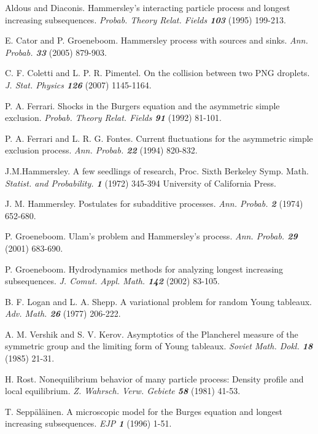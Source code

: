 \documentclass[reqno, 12pt]{amsart}
\begin{document}
\begin{thebibliography}{60}

 Aldous and Diaconis. Hammersley's interacting particle process and longest
increasing subsequences. {\sl Probab. Theory Relat. Fields \bf 103}
(1995) 199-213.

 E. Cator and P. Groeneboom. Hammersley process with sources and sinks. {\sl Ann. Probab. \bf 33} (2005) 879-903.

 C. F. Coletti and L. P. R. Pimentel. On the collision between two PNG droplets.
{\sl J. Stat. Physics \bf 126} (2007) 1145-1164.

 P. A. Ferrari. Shocks in the Burgers equation and the asymmetric simple exclusion.
{\sl Probab. Theory Relat. Fields \bf 91} (1992) 81-101.

 P. A. Ferrari and L. R. G. Fontes. Current fluctuations for the asymmetric simple exclusion process. {\sl Ann. Probab. \bf 22} (1994) 820-832.

 J.M.Hammersley. A few seedlings of research, Proc. Sixth Berkeley Symp. Math. {\sl Statist. and Probability. \bf 1} (1972) 345-394 University of California Press.

 J. M. Hammersley. Postulates for subadditive processes.
{\sl Ann. Probab. \bf 2} (1974) 652-680.

 P. Groeneboom. Ulam's problem and Hammersley's process.
{\sl Ann. Probab. \bf 29} (2001) 683-690.

 P. Groeneboom. Hydrodynamics methods for analyzing longest increasing subsequences.
{\sl J. Comut. Appl. Math. \bf 142} (2002) 83-105.

 B. F. Logan and L. A. Shepp. A variational problem for random Young tableaux.
{\sl Adv. Math. \bf 26} (1977) 206-222.

 A. M. Vershik and S. V. Kerov. Asymptotics of the Plancherel measure of the
symmetric group and the limiting form of Young tableaux. {\sl Soviet
Math. Dokl. \bf 18} (1985) 21-31.

 H. Rost. Nonequilibrium behavior of many particle process: Density profile and local equilibrium. {\sl Z. Wahrsch. Verw. Gebiete \bf 58} (1981) 41-53.

 T. Sepp\"{a}l\"{a}inen. A microscopic model for the Burges equation and longest increasing subsequences. {\sl EJP \bf 1} (1996) 1-51.

\end{thebibliography}
\end{document}
